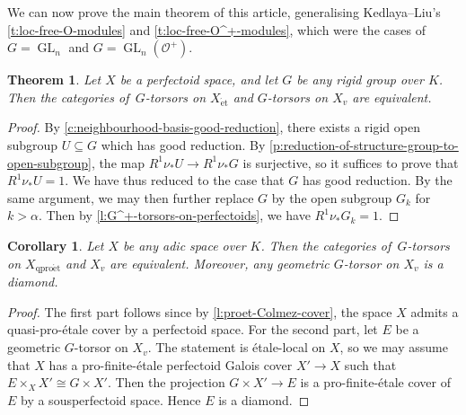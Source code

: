\documentclass[11pt]{amsart}
\numberwithin{equation}{section}
\newtheorem{Theorem}[thm]{Theorem}
\newtheorem{Corollary}[thm]{Corollary}
\theoremstyle{definition}
\theoremstyle{remark}
\renewcommand{\O}{\mathcal{O}}
\newcommand{\GL}{\operatorname{GL}}
\newcommand{\et}{{\operatorname{\acute{e}t}}}
\newcommand{\qproet}{{\operatorname{qpro\acute{e}t}}}
\begin{document}
We can now prove the main theorem of this article, generalising Kedlaya--Liu's \cref{t:loc-free-O-modules} and
\cref{t:loc-free-O^+-modules}, which were the cases of $G=\GL_n$ and $G=\GL_n(\O^+)$. 

\begin{Theorem}\label{t:G-torsors-on-perfectoids}
	Let $X$ be a perfectoid space, and let $G$ be any rigid group over $K$. Then the categories of\, $G$-torsors on $X_{\et}$ and $G$-torsors on $X_{v}$ are equivalent.
\end{Theorem}

\begin{proof}
	By \cref{c:neighbourhood-basis-good-reduction}, there exists a rigid open subgroup $U\subseteq G$ which has good reduction. By \cref{p:reduction-of-structure-group-to-open-subgroup}, the map
	$R^1\nu_{\ast}U\to R^1\nu_{\ast}G$
	is surjective, so it suffices to prove that $R^1\nu_{\ast}U=1$. 
	We have thus reduced to the case that $G$ has good reduction. By the same argument, we may then further replace $G$ by the open subgroup $G_k$ for $k>\alpha$. Then by \cref{l:G^+-torsors-on-perfectoids}, we have $R^1\nu_{\ast}G_k=1$.
\end{proof}

\begin{Corollary}\label{c:G-torsor-is-diamond}
	Let $X$ be any adic space over $K$. Then the categories of\, $G$-torsors on $X_{\qproet}$ and  $X_{v}$ are equivalent. Moreover, any geometric $G$-torsor on $X_v$ is a diamond.
\end{Corollary}

\begin{proof}
	The first part follows since by \cref{l:proet-Colmez-cover}, the space $X$ admits a quasi-pro-\'etale cover by a perfectoid space. For the second part,
	 let $E$ be a geometric $G$-torsor on $X_v$. The statement is \'etale-local on $X$, so we may assume that $X$ has a pro-finite-\'etale perfectoid Galois cover $X'\to X$ such that $E\times_XX'\cong G\times X'$. Then the projection $G\times X'\to E$ is a pro-finite-\'etale cover of $E$ by a sousperfectoid space. Hence $E$ is a diamond. 
\end{proof}


\end{document}
